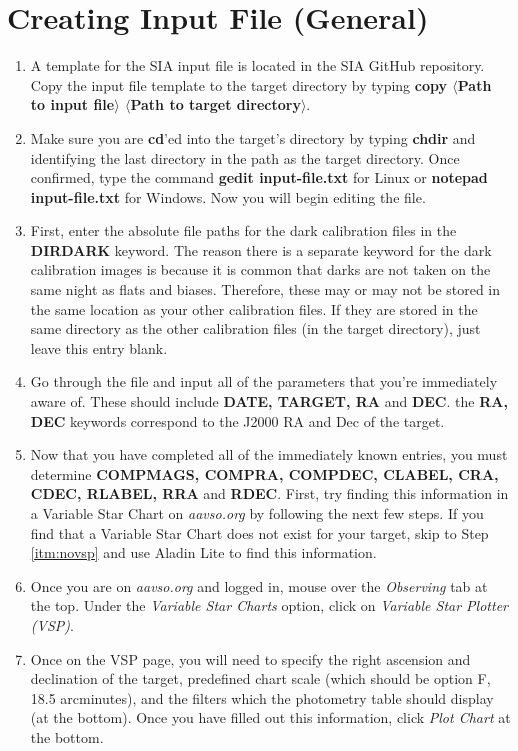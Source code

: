\documentclass[11pt]{report}
\begin{document}
\section{Creating Input File (General)}
\label{sect:inputfile}
\begin{enumerate}
\item A template for the SIA input file is located in the SIA GitHub repository. Copy the input file template to the target directory by typing {\bf copy $\langle$Path to input file$\rangle$ $\langle$Path to target directory$\rangle$}.
\item Make sure you are {\bf cd}'ed into the target's directory by typing \textbf{chdir} and identifying the last directory in the path as the target directory. Once confirmed, type the command {\bf gedit input-file.txt} for Linux or {\bf notepad input-file.txt} for Windows. Now you will begin editing the file.
\item First, enter the absolute file paths for the dark calibration files in the {\bf DIRDARK} keyword. The reason there is a separate keyword for the dark calibration images is because it is common that darks are not taken on the same night as flats and biases. Therefore, these may or may not be stored in the same location as your other calibration files. If they are stored in the same directory as the other calibration files (in the target directory), just leave this entry blank.
\item Go through the file and input all of the parameters that you're immediately aware of. These should include {\bf DATE, TARGET, RA} and {\bf DEC}. the {\bf RA, DEC} keywords correspond to the J2000 RA and Dec of the target.
\item Now that you have completed all of the immediately known entries, you must determine {\bf COMPMAGS, COMPRA, COMPDEC, CLABEL, CRA, CDEC, RLABEL, RRA} and {\bf RDEC}. First, try finding this information in a Variable Star Chart on \emph{aavso.org} by following the next few steps. If you find that a Variable Star Chart does not exist for your target, skip to Step \ref{itm:novsp} and use Aladin Lite to find this information.
\item Once you are on \emph{aavso.org} and logged in, mouse over the \emph{Observing} tab at the top. Under the \emph{Variable Star Charts} option, click on \emph{Variable Star Plotter (VSP)}. 
\item Once on the VSP page, you will need to specify the right ascension and declination of the target, predefined chart scale (which should be option F, 18.5 arcminutes), and the filters which the photometry table should display (at the bottom). Once you have filled out this information, click \emph{Plot Chart} at the bottom.

\end{enumerate}
\end{document}
